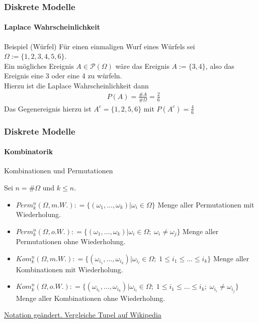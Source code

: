 \documentclass{beamer}
\begin{document}
 \begin{frame}
    \frametitle{Diskrete Modelle}
\framesubtitle{ Laplace Wahrscheinlichkeit}

\begin{block}{Beispiel (Würfel)}
Für einen einmaligen Wurf eines Würfels sei $\Omega := \{1,2,3,4,5,6\}$. \\
Ein mögliches Ereignis $A \in \mathcal{P}(\Omega)$ wäre das Ereignis $A := \{3,4\}$, also das Ereignis eine 3 oder eine 4 zu würfeln.  \\
Hierzu ist die Laplace Wahrscheinlichkeit dann 
\begin{align*}
& P(A) = \frac{ \#A}{ \# \Omega} = \frac{2}{6}
\end{align*}
Das Gegenereignis hierzu ist $A^c = \{1,2,5,6\}$ mit $P(A^c) = \frac{4}{6}$
\end{block}

 \end{frame}



\begin{frame}
    \frametitle{Diskrete Modelle}
\framesubtitle{Kombinatorik}
\begin{block}{Kombinationen und Permutationen}

Sei $n = \#\Omega$ und $k \leq n$.
\begin{itemize}
\item $Perm_k^n(\Omega, m.W.) : = \{ ( \omega_1, \ldots, \omega_k) | \omega_i \in \Omega \}$  Menge aller Permutationen mit Wiederholung.
\item $Perm_k^n(\Omega, o.W.) : = \{ ( \omega_1, \ldots, \omega_k) | \omega_i \in \Omega; \;  \omega_i \neq \omega_j  \}$  Menge aller Permutationen ohne Wiederholung.
\item $Kom_k^n(\Omega, m.W.) : = \{ ( \omega_{i_1}, \ldots, \omega_{i_k})  | \omega_{i_l} \in \Omega; \; 1  \leq i_1 \leq  \ldots  \leq i_k  \}$  Menge aller Kombinationen  mit Wiederholung.
\item $Kom_k^n(\Omega, o.W.) : = \{ ( \omega_{i_1}, \ldots, \omega_{i_k} ) | \omega_{i_l} \in \Omega; \; 1 \leq i_1  \leq \ldots \leq i_k; \;  \omega_{i_i} \neq \omega_{i_j} \} $  Menge aller Kombinationen  ohne  Wiederholung.
\end{itemize}
\href{https://de.wikipedia.org/wiki/Tupel}{Notation geändert. Vergleiche Tupel auf Wikipedia}
\end{block}

 \end{frame}
 
\end{document}
